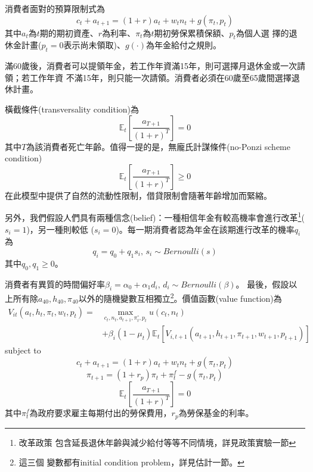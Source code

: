 \documentclass[12pt]{article}
\begin{document}
\begin{CJK*}{UTF8}{bkai}
消費者面對的預算限制式為
\begin{equation}
    c_t + a_{t+1} = (1+r)a_t + w_t n_t + g(\pi_t,p_t)
\end{equation}
其中$a_t$為$t$期的期初資產、$r$為利率、$\pi_t$為$t$期初勞保累積保額、$p_t$為個人選
擇的退休金計畫($p_t=0$表示尚未領取)、$g(\cdot)$為年金給付之規則。

滿60歲後，消費者可以提領年金，若工作年資滿15年，則可選擇月退休金或一次請領；若工作年資
不滿15年，則只能一次請領。消費者必須在60歲至65歲間選擇退休計畫。

橫截條件(transversality condition)為
\begin{equation}
    \mathbb{E}_t[\frac{a_{T+1}}{(1+r)^T}] = 0
\end{equation}
其中$T$為該消費者死亡年齡。值得一提的是，無龐氏計謀條件(no-Ponzi scheme condition)
\begin{equation}
    \mathbb{E}_t[\frac{a_{T+1}}{(1+r)^T}] \geq 0
\end{equation}
在此模型中提供了自然的流動性限制，借貸限制會隨著年齡增加而緊縮。

另外，我們假設人們具有兩種信念(belief)：一種相信年金有較高機率會進行改革\footnote{改革政策
包含延長退休年齡與減少給付等等不同情境，詳見政策實驗一節}($s_i=1$)，另一種則較低
($s_i=0$)。每一期消費者認為年金在該期進行改革的機率$q_i$為
\begin{equation}
    q_i = q_0 + q_1 s_i \text{, } s_i \sim Bernoulli(s)
\end{equation}
其中$q_0,q_1 \geq 0$。

消費者有異質的時間偏好率$\beta_i = \alpha_0 + \alpha_1 d_i \text{, } d_i \sim Bernoulli(\beta)$。
最後，假設以上所有除$a_{40}, h_{40}, \pi_{40}$以外的隨機變數互相獨立\footnote{這三個
變數都有initial condition problem，詳見估計一節。}。價值函數(value function)為
\begin{equation}
    \begin{split}
        V_{it}(a_t,h_t,\pi_t,w_t,p_t) = &\max_{c_t,n_t,a_{t+1},\pi^\circ_t,p_t} u(c_t,n_t) \\
        &+ \beta_i (1-\mu_t) \mathbb{E}_t[V_{i,t+1}(a_{t+1},h_{t+1},\pi_{t+1},w_{t+1},p_{t+1})]
    \end{split}
\end{equation}
subject to
\begin{equation}
    c_t + a_{t+1} = (1+r)a_t + w_t n_t + g(\pi_t,p_t)
\end{equation}
\begin{equation}
    \pi_{t+1} = (1+r_p) \pi_t + \pi^f_t - g(\pi_t,p_t)
\end{equation}
\begin{equation}
    \mathbb{E}_t[\frac{a_{T+1}}{(1+r)^T}] = 0
\end{equation}
其中$\pi^f_t$為政府要求雇主每期付出的勞保費用，$r_p$為勞保基金的利率。


\end{CJK*}
\end{document}

